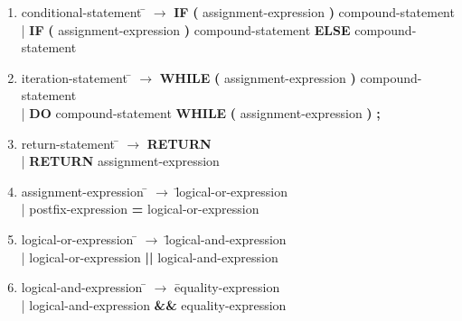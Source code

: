 \documentclass[12pt]{article}
\begin{document}
\begin{enumerate}
\item \begin{tabbing} conditional-statement \= $\rightarrow$ \= \textbf{IF} \textbf{(} assignment-expression \textbf{)} compound-statement \\
	\> \hspace*{0.05cm} | \> \textbf{IF} \textbf{(} assignment-expression \textbf{)} compound-statement \textbf{ELSE} compound-statement
\end{tabbing}

\item \begin{tabbing} iteration-statement \= $\rightarrow$ \= \textbf{WHILE} \textbf{(} assignment-expression \textbf{)} compound-statement \\
	\> \hspace*{0.05cm} | \> \textbf{DO} compound-statement \textbf{WHILE} \textbf{(} assignment-expression \textbf{)} \textbf{;}
\end{tabbing}

\item \begin{tabbing} return-statement \= $\rightarrow$ \= \textbf{RETURN} \\
	\> \hspace*{0.05cm} | \> \textbf{RETURN} assignment-expression
\end{tabbing}

\item \begin{tabbing} assignment-expression \= $\rightarrow$ \= logical-or-expression \\
	\> \hspace*{0.05cm} | \> postfix-expression \textbf{=} logical-or-expression
\end{tabbing}

\item \begin{tabbing} logical-or-expression \= $\rightarrow$ \= logical-and-expression \\
	\> \hspace*{0.05cm} | \> logical-or-expression \textbf{||} logical-and-expression
\end{tabbing}

\item \begin{tabbing} logical-and-expression \= $\rightarrow$ \= equality-expression \\
	\> \hspace*{0.05cm} | \> logical-and-expression \textbf{\&\&} equality-expression
\end{tabbing}


\end{enumerate}
\end{document}
